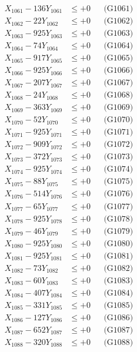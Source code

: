 \documentclass[a4paper,10pt]{article}
\begin{document}
{\begin{align}
\allowbreak
X_{1061} - 136Y_{1061} &\leq +0 && \text{(G1061)} \\
X_{1062} - 22Y_{1062} &\leq +0 && \text{(G1062)} \\
X_{1063} - 925Y_{1063} &\leq +0 && \text{(G1063)} \\
X_{1064} - 74Y_{1064} &\leq +0 && \text{(G1064)} \\
X_{1065} - 917Y_{1065} &\leq +0 && \text{(G1065)} \\
X_{1066} - 925Y_{1066} &\leq +0 && \text{(G1066)} \\
X_{1067} - 207Y_{1067} &\leq +0 && \text{(G1067)} \\
X_{1068} - 24Y_{1068} &\leq +0 && \text{(G1068)} \\
X_{1069} - 363Y_{1069} &\leq +0 && \text{(G1069)} \\
X_{1070} - 52Y_{1070} &\leq +0 && \text{(G1070)} \\
\allowbreak
X_{1071} - 925Y_{1071} &\leq +0 && \text{(G1071)} \\
X_{1072} - 909Y_{1072} &\leq +0 && \text{(G1072)} \\
X_{1073} - 372Y_{1073} &\leq +0 && \text{(G1073)} \\
X_{1074} - 925Y_{1074} &\leq +0 && \text{(G1074)} \\
X_{1075} - 88Y_{1075} &\leq +0 && \text{(G1075)} \\
X_{1076} - 514Y_{1076} &\leq +0 && \text{(G1076)} \\
X_{1077} - 65Y_{1077} &\leq +0 && \text{(G1077)} \\
X_{1078} - 925Y_{1078} &\leq +0 && \text{(G1078)} \\
X_{1079} - 46Y_{1079} &\leq +0 && \text{(G1079)} \\
X_{1080} - 925Y_{1080} &\leq +0 && \text{(G1080)} \\
\allowbreak
X_{1081} - 925Y_{1081} &\leq +0 && \text{(G1081)} \\
X_{1082} - 73Y_{1082} &\leq +0 && \text{(G1082)} \\
X_{1083} - 60Y_{1083} &\leq +0 && \text{(G1083)} \\
X_{1084} - 407Y_{1084} &\leq +0 && \text{(G1084)} \\
X_{1085} - 331Y_{1085} &\leq +0 && \text{(G1085)} \\
X_{1086} - 127Y_{1086} &\leq +0 && \text{(G1086)} \\
X_{1087} - 652Y_{1087} &\leq +0 && \text{(G1087)} \\
X_{1088} - 320Y_{1088} &\leq +0 && \text{(G1088)} \\

\end{align}}
\end{document}
